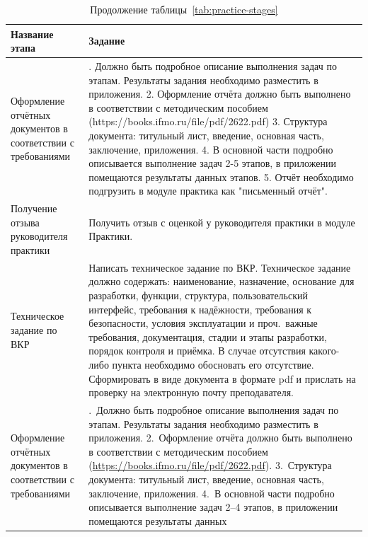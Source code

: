 \newpage
\begin{table}[h]
  \centering
  \caption*{Продолжение таблицы~\ref{tab:practice-stages}}
  \renewcommand{\arraystretch}{1.2}
  \begin{tabularx}{\textwidth}{|>{\raggedright\arraybackslash}p{}|>{\raggedright\arraybackslash}X|}
    \hline
    \textbf{Название этапа} & \textbf{Задание} \\
    \hline
    Оформление отчётных документов в соответствии с требованиями & 1. Должно быть подробное описание выполнения задач по этапам. Результаты задания необходимо разместить в приложения. 2. Оформление отчёта должно быть выполнено в соответствии с методическим пособием (https://books.ifmo.ru/file/pdf/2622.pdf) 3. Структура документа: титульный лист, введение, основная часть, заключение, приложения. 4. В основной части подробно описывается выполнение задач 2-5 этапов, в приложении помещаются результаты данных этапов. 5. Отчёт необходимо подгрузить в модуле практика как "письменный отчёт". \\
    \hline
    Получение отзыва руководителя практики & Получить отзыв с оценкой у руководителя практики в модуле Практики. \\
    \hline
    Техническое задание по ВКР & Написать техническое задание по ВКР. Техническое задание должно содержать: наименование, назначение, основание для разработки, функции, структура, пользовательский интерфейс, требования к надёжности, требования к безопасности, условия эксплуатации и проч.\ важные требования, документация, стадии и этапы разработки, порядок контроля и приёмка. В случае отсутствия какого-либо пункта необходимо обосновать его отсутствие. Сформировать в виде документа в формате pdf и прислать на проверку на электронную почту преподавателя. \\
    \hline
    Оформление отчётных документов в соответствии с требованиями & 1.~Должно быть подробное описание выполнения задач по этапам. Результаты задания необходимо разместить в приложения. 2.~Оформление отчёта должно быть выполнено в соответствии с методическим пособием (\url{https://books.ifmo.ru/file/pdf/2622.pdf}). 3.~Структура документа: титульный лист, введение, основная часть, заключение, приложения. 4.~В основной части подробно описывается выполнение задач 2--4 этапов, в приложении помещаются результаты данных\\
    \hline
  \end{tabularx}
\end{table}

